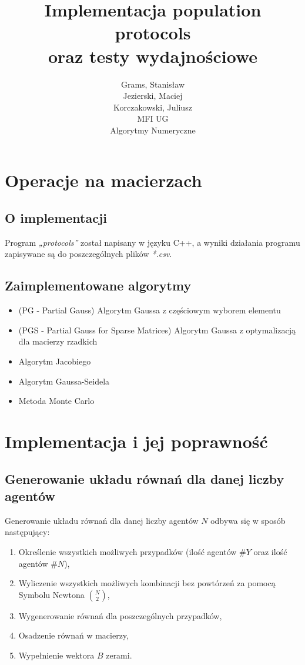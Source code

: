\documentclass[10pt]{article}
\begin{document}
\title{Implementacja population protocols\\oraz testy wydajnościowe}
\author{Grams, Stanisław\\Jezierski, Maciej\\Korczakowski, Juliusz\\ MFI UG\\Algorytmy Numeryczne}

\maketitle
\section {Operacje na macierzach}
\subsection{O implementacji}
Program \textit{„protocols”} został napisany w języku C++, a wyniki działania programu zapisywane są do poszczególnych plików \textit{*.csv}.
\subsection{Zaimplementowane algorytmy}
\begin{itemize}
	\item (PG - Partial Gauss) Algorytm Gaussa z częściowym wyborem elementu
	\item (PGS - Partial Gauss for Sparse Matrices) Algorytm Gaussa z optymalizacją dla macierzy rzadkich
	\item Algorytm Jacobiego
	\item Algorytm Gaussa-Seidela
	\item Metoda Monte Carlo
\end{itemize}

\section{Implementacja i jej poprawność}
\subsection{Generowanie układu równań dla danej liczby agentów}
Generowanie układu równań dla danej liczby agentów $N$ odbywa się w sposób następujący:
\begin{enumerate}
	\item Określenie wszystkich możliwych przypadków (ilość agentów $\#Y$ oraz ilość agentów $\#N$),
	\item Wyliczenie wszystkich możliwych kombinacji bez powtórzeń za pomocą Symbolu Newtona ${{N} \choose {2}}$,
	\item Wygenerowanie równań dla poszczególnych przypadków,
	\item Osadzenie równań w macierzy,
	\item Wypełnienie wektora $B$ zerami.
\end{enumerate}
\end{document}
